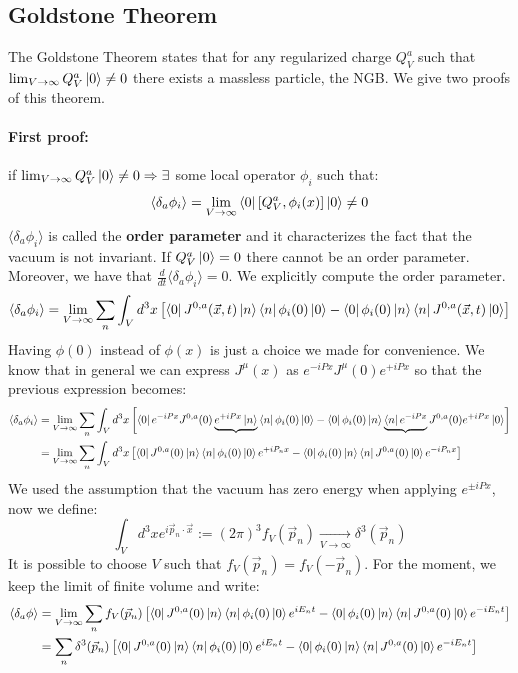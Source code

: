 \documentclass[../main.tex]{subfiles}
\begin{document}
\subsection{Goldstone Theorem}
The Goldstone Theorem states that for any regularized charge $Q_V^a$ such that $\lim_{V\to\infty}Q_V^a\ket{0}\neq0$ there exists a massless particle, the NGB. We give two proofs of this theorem.
\paragraph{First proof:} if $\lim_{V\to\infty}Q_V^a\ket{0}\neq0\Rightarrow\exists$ some local operator $\phi_i$ such that:
\[
\langle\delta_a\phi_i\rangle=\lim_{V\to\infty}\bra{0}[Q_V^a,\phi_i(x)]\ket{0}\neq0
\]
$\langle\delta_a\phi_i\rangle$ is called the \textbf{order parameter} and it characterizes the fact that the vacuum is not invariant. If $Q_V^a\ket{0}=0$ there cannot be an order parameter. Moreover, we have that $\frac{d}{dt}\langle\delta_a\phi_i\rangle=0$. We explicitly compute the order parameter.
\[
\langle\delta_a\phi_i\rangle=\lim_{V\to\infty}\sum_n\int_Vd^3x\left[\bra{0}J^{0,a}(\Vec{x},t)\ket{n}\bra{n}\phi_i(0)\ket{0}-\bra{0}\phi_i(0)\ket{n}\bra{n}J^{0,a}(\Vec{x},t)\ket{0}\right]
\]
Having $\phi(0)$ instead of $\phi(x)$ is just a choice we made for convenience. We know that in general we can express $J^\mu(x)$ as $e^{-iPx}J^\mu(0)e^{+iPx}$ so that the previous expression becomes:
\begin{align*}
\langle\delta_a\phi_i\rangle&=\lim_{V\to\infty}\sum_n\int_Vd^3x\left[\bra{0}e^{-iPx}J^{0,a}(0)\underbrace{e^{+iPx}\ket{n}}\bra{n}\phi_i(0)\ket{0}-\bra{0}\phi_i(0)\ket{n}\underbrace{\bra{n}e^{-iPx}}J^{0,a}(0)e^{+iPx}\ket{0}\right]\\
&=\lim_{V\to\infty}\sum_n\int_Vd^3x\left[\bra{0}J^{0,a}(0)\ket{n}\bra{n}\phi_i(0)\ket{0}e^{+iP_nx}-\bra{0}\phi_i(0)\ket{n}\bra{n}J^{0,a}(0)\ket{0}e^{-iP_nx}\right]
\end{align*}
We used the assumption that the vacuum has zero energy when applying $e^{\pm iPx}$, now we define:
\[
\int_Vd^3xe^{i\Vec{p}_n\cdot\Vec{x}}:=(2\pi)^3f_V(\Vec{p}_n)\xrightarrow[V\to\infty]{}\delta^3(\Vec{p}_n)
\]
It is possible to choose $V$ such that $f_V(\Vec{p}_n)=f_V(-\Vec{p}_n)$. For the moment, we keep the limit of finite volume and write:
\begin{align*}
\langle\delta_a\phi\rangle&=\lim_{V\to\infty}\sum_nf_V(\Vec{p}_n)\left[\bra{0}J^{0,a}(0)\ket{n}\bra{n}\phi_i(0)\ket{0}e^{iE_nt}-\bra{0}\phi_i(0)\ket{n}\bra{n}J^{0,a}(0)\ket{0}e^{-iE_nt}\right]\\
&=\sum_n\delta^3(\Vec{p}_n)\left[\bra{0}J^{0,a}(0)\ket{n}\bra{n}\phi_i(0)\ket{0}e^{iE_nt}-\bra{0}\phi_i(0)\ket{n}\bra{n}J^{0,a}(0)\ket{0}e^{-iE_nt}\right]
\end{align*}
\end{document}
